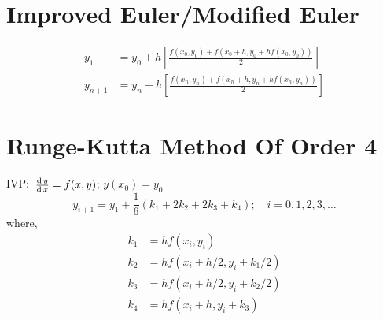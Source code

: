 \documentclass[../main-sheet.tex]{subfiles}
\begin{document}
\section{Improved Euler/Modified Euler}
\begin{align*}
    y_1&=y_0+h\left[ \frac{f(x_0,y_0)+f(x_0+h,y_0+hf(x_0,y_0))}{2} \right]\\
    y_{n+1}&=y_n+h\left[ \frac{f(x_n,y_n)+f(x_n+h,y_n+hf(x_n,y_n))}{2} \right]
\end{align*}
\section{Runge-Kutta Method Of Order 4}
IVP: \(\,\frac{\mathrm{d}\,y}{\mathrm{d}\,x}=f(x,y)\); \(y(x_0)=y_0\)\\
\[
    y_{i+1}=y_1+\frac{1}{6}(k_1+2k_2+2k_3+k_4);\quad i=0,1,2,3,\dots
\]
where,
\begin{align*}
    k_1&=hf(x_i,y_i)\\
    k_2&=hf(x_i+h/2,y_i+k_1/2)\\
    k_3&=hf(x_i+h/2,y_i+k_2/2)\\
    k_4&=hf(x_i+h,y_i+k_3)
\end{align*}
\end{document}
